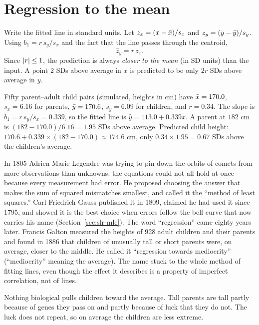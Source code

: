 \section{Regression to the mean}
\label{sec:slr-rtm}

Write the fitted line in standard units. Let
$z_x = (x-\bar{x})/s_x$ and $z_y = (y-\bar{y})/s_y$. Using $b_1 = r\,s_y/s_x$ and
the fact that the line passes through the centroid,
\[
  \hat z_y = r\, z_x .
\]
Since $\lvert r\rvert\le 1$, the prediction is always \emph{closer to the mean} (in SD
units) than the input. A point $2$ SDs above average in $x$ is predicted to be
only $2r$ SDs above average in $y$.

\begin{example}
Fifty parent--adult child pairs (simulated, heights in cm) have
$\bar{x} = 170.0$, $s_x = 6.16$ for parents, $\bar{y}=170.6$, $s_y = 6.09$ for
children, and $r = 0.34$. The slope is $b_1 = r\,s_y/s_x = 0.339$, so the
fitted line is $\hat y = 113.0 + 0.339x$. A parent at $182$ cm is
$(182-170.0)/6.16 = 1.95$ SDs above average. Predicted child height:
$170.6 + 0.339\times(182-170.0) \approx 174.6$ cm, only
$0.34\times 1.95 = 0.67$ SDs above the children's average.
\end{example}

\begin{historybox}
In 1805 Adrien-Marie Legendre was trying to pin down the orbits of comets from
more observations than unknowns: the equations could not all hold at once
because every measurement had error. He proposed choosing the answer that
makes the sum of squared mismatches smallest, and called it the ``method of
least squares.'' Carl Friedrich Gauss published it in 1809, claimed he had
used it since 1795, and showed it is the best choice when errors follow the
bell curve that now carries his name (Section~\ref{sec:slr-mle}). The word
``regression'' came eighty years later. Francis Galton measured the heights of
928 adult children and their parents and found in 1886 that children of
unusually tall or short parents were, on average, closer to the middle. He
called it ``regression towards mediocrity'' (``mediocrity'' meaning the
average). The name stuck to the whole method of fitting lines, even though the
effect it describes is a property of imperfect correlation, not of lines.
\end{historybox}

Nothing biological pulls children toward the average. Tall parents are tall partly because of genes they pass on and partly
because of luck that they do not. The luck does not repeat, so on average the
children are less extreme.

